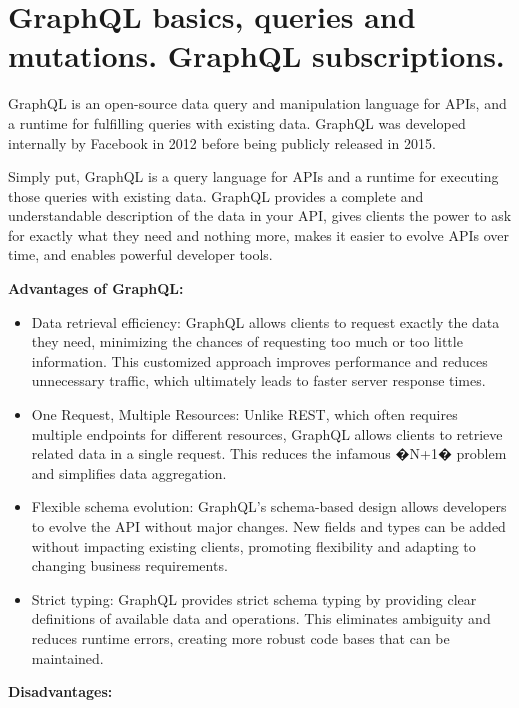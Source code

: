 
\pagebreak

\chapter{GraphQL basics, queries and mutations. GraphQL subscriptions.}


\medskip

GraphQL is an open-source data query and manipulation language for APIs, and a runtime for fulfilling queries with existing data. GraphQL was developed internally by Facebook in 2012 before being publicly released in 2015.

Simply put, GraphQL is a query language for APIs and a runtime for executing those queries with existing data. GraphQL provides a complete and understandable description of the data in your API, gives clients the power to ask for exactly what they need and nothing more, makes it easier to evolve APIs over time, and enables powerful developer tools.


\textbf{Advantages of GraphQL:}

\begin{itemize}
\item Data retrieval efficiency: GraphQL allows clients to request exactly the data they need, minimizing the chances of requesting too much or too little information. This customized approach improves performance and reduces unnecessary traffic, which ultimately leads to faster server response times.

\item One Request, Multiple Resources: Unlike REST, which often requires multiple endpoints for different resources, GraphQL allows clients to retrieve related data in a single request. This reduces the infamous �N+1� problem and simplifies data aggregation.

\item Flexible schema evolution: GraphQL's schema-based design allows developers to evolve the API without major changes. New fields and types can be added without impacting existing clients, promoting flexibility and adapting to changing business requirements.

\item Strict typing: GraphQL provides strict schema typing by providing clear definitions of available data and operations. This eliminates ambiguity and reduces runtime errors, creating more robust code bases that can be maintained.
\end{itemize}

\textbf{Disadvantages:}


